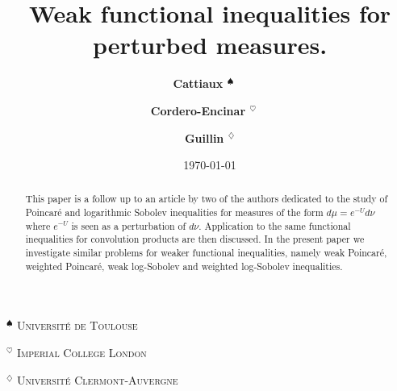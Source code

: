 \documentclass[11pt,reqno]{amsart}
\numberwithin{equation}{section}
\theoremstyle{definition}
\theoremstyle{remark}
\begin{document}
\date{\today}



\title[Weak inequalities for perturbed measures]{Weak functional inequalities for perturbed measures.}

 \author[P. Cattiaux]{\textbf{ Cattiaux $^{\spadesuit}$ \, \, }}
\address{{\bf {Patrick} CATTIAUX},\\ Institut de Math\'ematiques de Toulouse. CNRS UMR 5219. \\
Universit\'e de Toulouse,
\\ 118 route
de Narbonne, F-31062 Toulouse cedex 09.} 


 \author[P. Cordero-Encinar]{\textbf{ Cordero-Encinar $^{\heartsuit}$ \, \, }}
\address{{\bf {Paula} CORDERO-ENCINAR},\\ Department of Mathematics. Imperial College London. \\
London. UK} 


\author[A. Guillin]{\textbf{ Guillin $^{\diamondsuit}$}}
\address{{\bf {Arnaud} GUILLIN},\\Universit\'e Clermont Auvergne, CNRS, LMBP, F-63000 CLERMONT-FERRAND, FRANCE.} 


\maketitle



 \begin{center}



 \textsc{$^{\spadesuit}$  Universit\'e de Toulouse}
\smallskip



 \textsc{$^{\heartsuit}$  Imperial College London}
\smallskip

\textsc{$^{\diamondsuit}$ Universit\'e Clermont-Auvergne}
\smallskip


\end{center}


\begin{abstract}
This paper is a follow up to an article by two of the authors dedicated to the study of Poincar\'e and logarithmic Sobolev inequalities for measures of the form $d\mu = e^{-U} d\nu$ where $e^{-U}$ is seen as a perturbation of $d\nu$. Application to the same functional inequalities for convolution products are then discussed. In the present paper we investigate similar problems for weaker functional inequalities, namely weak Poincar\'e, weighted Poincar\'e, weak log-Sobolev and weighted log-Sobolev inequalities.
\end{abstract}
\bigskip
\end{document}
